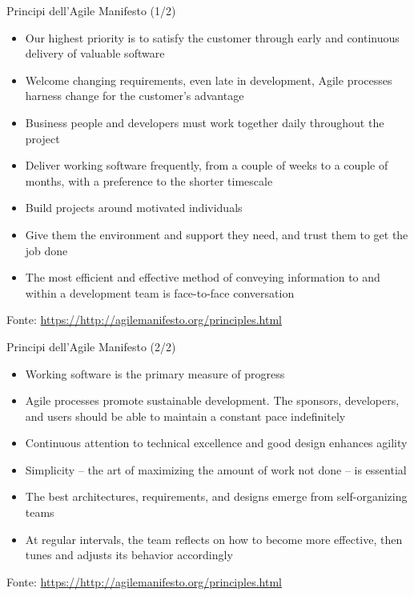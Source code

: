 \documentclass{beamer}
\begin{document}
\begin{frame}{\centerline{Principi dell'Agile Manifesto (1/2)}}

\begin{itemize}
\item  Our highest priority is to satisfy the customer through early and continuous delivery of valuable software
\item  Welcome changing requirements, even late in development, Agile processes harness change for the customer's advantage
\item  Business people and developers must work together daily throughout the project
\item  Deliver working software frequently, from a couple of weeks to a couple of months, with a preference to the shorter timescale
\item  Build projects around motivated individuals
\item  Give them the environment and support they need, and trust them to get the job done
\item  The most efficient and effective method of conveying information to and within a development team is face-to-face conversation
\end{itemize}

\begin{center}
\tiny
Fonte: \url{https://http://agilemanifesto.org/principles.html}
\end{center}

\end{frame}

\begin{frame}{\centerline{Principi dell'Agile Manifesto (2/2)}}

\begin{itemize}
\item  Working software is the primary measure of progress
\item  Agile processes promote sustainable development. The sponsors, developers, and users should be able to maintain a constant pace indefinitely
\item  Continuous attention to technical excellence and good design enhances agility
\item  Simplicity -- the art of maximizing the amount of work not done -- is essential
\item  The best architectures, requirements, and designs emerge from self-organizing teams
\item  At regular intervals, the team reflects on how to become more effective, then tunes and adjusts its behavior accordingly
\end{itemize}

\begin{center}
\tiny
Fonte: \url{https://http://agilemanifesto.org/principles.html}
\end{center}

\end{frame}
\end{document}
